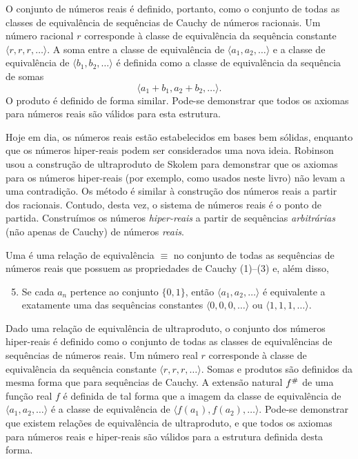 O conjunto de números reais é definido, portanto, como o conjunto de todas
as classes de equivalência de sequências de Cauchy de números racionais. Um
número racional $r$ corresponde à classe de equivalência da sequência
constante $\langle r, r, r, \ldots \rangle$. A soma entre a classe de
equivalência de $\langle a_1, a_2, \ldots \rangle$ e a classe de
equivalência de $\langle b_1, b_2, \ldots \rangle$ é definida como a classe
de equivalência da sequência de somas
$$
  \langle a_1+b_1 , a_2+b_2, \ldots \rangle.
$$
O produto é definido de forma similar. Pode-se demonstrar que todos os
axiomas para números reais são válidos para esta estrutura.

Hoje em dia, os números reais estão estabelecidos em bases bem sólidas,
enquanto que os números hiper-reais podem ser considerados uma nova
ideia. Robinson usou a construção de ultraproduto
de Skolem para demonstrar
que os axiomas para os números hiper-reais (por exemplo, como usados neste
livro) não levam a uma contradição. Os método é similar à construção dos
números reais a partir dos racionais. Contudo, desta vez, o sistema de
números reais é o ponto de partida. Construímos os números \emph{hiper-reais}
a partir de sequências \emph{arbitrárias} (não apenas de Cauchy) de números
\emph{reais}.

Uma 
é uma relação de equivalência $\equiv$ no conjunto de todas as sequências
de números reais que possuem as propriedades de Cauchy (1)--(3) e, além disso,
\begin{enumerate}[(1)]
\setcounter{enumi}{4}
\item Se cada $a_n$ pertence ao conjunto $\{0, 1\}$, então
      $\langle a_1, a_2, \ldots \rangle$ é equivalente a exatamente uma das
      sequências constantes $\langle 0, 0, 0, \ldots \rangle$ ou
      $\langle 1, 1, 1, \ldots \rangle$.
\end{enumerate}

Dado uma relação de equivalência de ultraproduto, o conjunto dos números
hiper-reais é definido como o conjunto de todas as classes de equivalências
de sequências de números reais. Um número real $r$ corresponde à classe de
equivalência da sequência constante $\langle r, r, r, \ldots \rangle$. Somas
e produtos são definidos da mesma forma que para sequências de Cauchy.
A extensão natural ${f}^\#$ de uma função real $f$ é definida de tal forma
que a imagem da classe de equivalência de $\langle a_1, a_2, \ldots \rangle$ é
a classe de equivalência de $\langle f(a_1), f(a_2), \ldots \rangle$. Pode-se
demonstrar que existem relações de equivalência de ultraproduto, e que todos
os axiomas para números reais e hiper-reais são válidos para a estrutura
definida desta forma.

